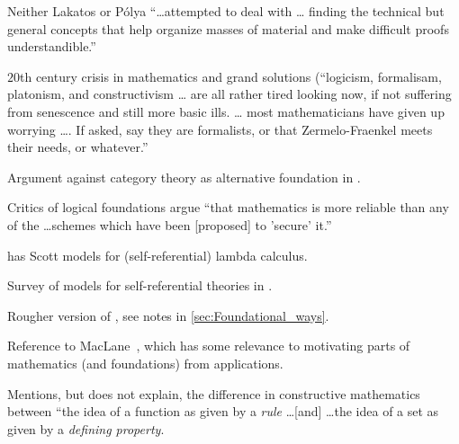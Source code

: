 Neither Lakatos or P\'{o}lya ``\ldots attempted to deal with 
\ldots
finding the technical but general concepts that 
help organize masses of material and make difficult 
proofs understandible.''

\label{sec:Foundational_ways}

\cite[ch~4 ``Foundational ways'']{Feferman1998LightOfLogic}

$20$th century crisis in mathematics and grand solutions 
(``logicism, formalisam, platonism, and constructivism \ldots
are all rather tired looking now, if not suffering from
senescence and still more basic ills. \ldots
most mathematicians have given up worrying \dots .
If asked, say they are formalists, or that
Zermelo-Fraenkel meets their needs, or whatever.''

Argument against category theory as alternative 
foundation in \cite{Feferman1977Categorical}.

Critics of logical foundations argue ``that mathematics
is more reliable than any of the \ldots schemes which have been
[proposed] to 'secure' it.''

\cite[ch~4, p~99]{Feferman1998LightOfLogic} has
Scott models for (self-referential) lambda 
calculus.~\cite{scottContinuousLattices1972,
scottDataTypesLattices1976}

Survey of models for self-referential theories in 
\cite{fefermanTypeFreeTheoriesI1984}.

\label{sec:Working_foundations_1991}

\cite[ch~5 ``Working foundations 1991'']{Feferman1998LightOfLogic}

Rougher version of \cite[ch~4]{Feferman1998LightOfLogic},
see notes in \autoref{sec:Foundational_ways}.

Reference to MacLane~\cite{maclane1981mathModels},
which has some relevance to motivating
parts of mathematics (and foundations)
from applications.


Mentions, but does not explain, the difference 
in constructive mathematics between
``the idea of a function as given by a \textit{rule}
\ldots [and] \ldots the idea of a set as given by a 
\textit{defining property}.~\cite{feferman1979FunctionsClasses}

